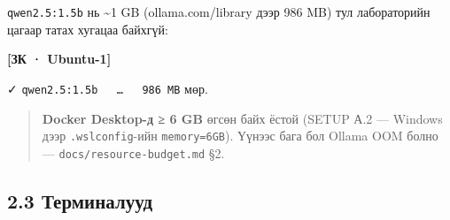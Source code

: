 \texttt{qwen2.5:1.5b} нь \textasciitilde1 GB (ollama.com/library дээр 986 MB) тул лабораторийн цагаар татах хугацаа байхгүй:

\textbf{{[}ЗК · Ubuntu-1{]}}

\begin{Shaded}
\begin{Highlighting}[]
\KeywordTok{\&\&} 
\end{Highlighting}
\end{Shaded}

✓ \texttt{qwen2.\allowbreak{}5:\allowbreak{}1.\allowbreak{}5b\ \ \ \ldots{}\ \ \ 986\ MB} мөр.

\begin{quote}
\textbf{Docker Desktop-д ≥ 6 GB} өгсөн байх ёстой (SETUP А.2 --- Windows дээр \texttt{.wslconfig}-ийн \texttt{memory=6GB}). Үүнээс бага бол Ollama OOM болно --- \texttt{docs/\allowbreak{}resource-budget.\allowbreak{}md} §2.
\end{quote}

\hypertarget{ux442ux435ux440ux43cux438ux43dux430ux43bux443ux443ux434}{%
\subsection{2.3 Терминалууд}\label{ux442ux435ux440ux43cux438ux43dux430ux43bux443ux443ux434}}

